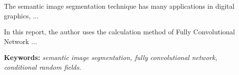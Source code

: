 \documentclass[./thesis.tex]{subfiles}
\begin{document}
{\fontsize{13}{12} \selectfont
The semantic image segmentation technique has many applications in digital graphics, ...}

{\fontsize{13}{12} \selectfont
In this report, the author uses the calculation method of Fully Convolutional Network ...}
\bigskip

{\bf Keywords:} \textit{ semantic image segmentation, fully convolutional network, conditional random fields.}
\end{document}
